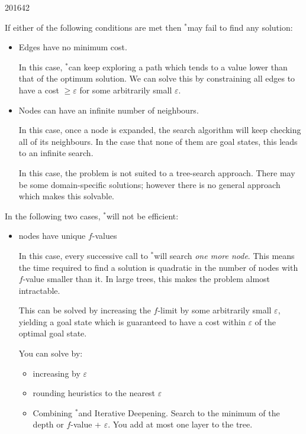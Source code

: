 \documentclass[10pt,\jkfside,a4paper]{article}
\newcommand{\idastar}{\text{IDA}\ensuremath{^*}}
\begin{document}
\begin{examquestion}{2016}{4}{2}
\begin{enumerate}[label=(\alph*)]
If either of the following conditions are met then \idastar may fail to
find any solution:

\begin{itemize}

\item Edges have no minimum cost.

In this case, \idastar can keep exploring a path which tends to a value
lower than that of the optimum solution. We can solve this by constraining
all edges to have a cost $\geq \varepsilon$ for some arbitrarily small
$\varepsilon$.

\item Nodes can have an infinite number of neighbours.

In this case, once a node is expanded, the search algorithm will keep
checking all of its neighbours. In the case that none of them are goal
states, this leads to an infinite search.

In this case, the problem is not suited to a tree-search approach. There may
be some domain-specific solutions; however there is no general approach
which makes this solvable.

\end{itemize}

In the following two cases, \idastar will not be efficient:
\begin{itemize}

\item nodes have unique $f$-values

In this case, every successive call to \idastar will search \textit{one more
node}. This means the time required to find a solution is quadratic in the
number of nodes with $f$-value smaller than it. In large trees, this makes
the problem almost intractable.

This can be solved by increasing the $f$-limit by some arbitrarily small
$\varepsilon$, yielding a goal state which is guaranteed to have a cost within
$\varepsilon$ of the optimal goal state.

{\color{blue}
You can solve by:
\begin{itemize}

\item increasing by $\varepsilon$

\item rounding heuristics to the nearest $\varepsilon$

\item Combining \idastar and Iterative Deepening. Search to the minimum of
the depth or $f$-value + $\varepsilon$. You add at most one layer to the tree.


\end{itemize}}
\end{itemize}
\end{enumerate}
\end{examquestion}
\end{document}
